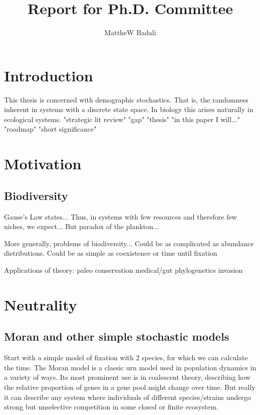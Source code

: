 \documentclass[a4paper,11pt]{article}
\title{Report for Ph.D. Committee}
\author{MattheW Badali}
\numberwithin{equation}{section} %
\begin{document}

\fi


\section{Introduction}

This thesis is concerned with demographic stochastics. That is, the randomness inherent in systems with a discrete state space. 
In biology this arises naturally in ecological systems. 
"strategic lit review"
"gap"
"thesis" "in this paper I will..."
"roadmap"
"short significance"





\section{Motivation}
\subsection{Biodiversity}
Gause's Law states...
Thus, in systems with few resources and therefore few niches, we expect...
But paradox of the plankton...

More generally, problems of biodiversity...
Could be as complicated as abundance distributions. 
Could be as simple as coexistence or time until fixation

Applications of theory:
paleo
conservation
medical/gut
phylogenetics
invasion%








\section{Neutrality}
\subsection{Moran and other simple stochastic models}
Start with a simple model of fixation with 2 species, for which we can calculate the time. 
The Moran model \cite{Moran1962} is a classic urn model used in population dynamics in a variety of ways. 
Its most prominent use is in coalescent theory, describing how the relative proportion of genes in a gene pool might change over time. 
But really it can describe any system where individuals of different species/strains undergo strong but unselective competition in some closed or finite ecosystem. 
\end{document}
